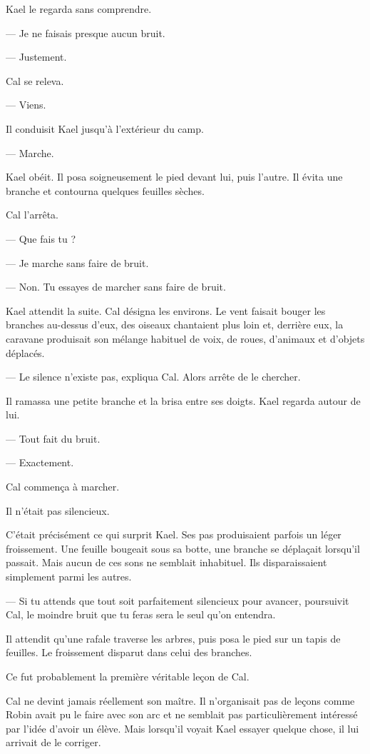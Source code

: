 Kael le regarda sans comprendre.

— Je ne faisais presque aucun bruit.

— Justement.

Cal se releva.

— Viens.

\scenebreak

Il conduisit Kael jusqu'à l'extérieur du camp.

— Marche.

Kael obéit. Il posa soigneusement le pied devant lui, puis l'autre. Il évita
une branche et contourna quelques feuilles sèches.

Cal l'arrêta.

— Que fais tu ?

— Je marche sans faire de bruit.

— Non. Tu essayes de marcher sans faire de bruit.

Kael attendit la suite. Cal désigna les environs. Le vent faisait bouger les
branches au-dessus d'eux, des oiseaux chantaient plus loin et, derrière eux, la
caravane produisait son mélange habituel de voix, de roues, d'animaux et
d'objets déplacés.

— Le silence n'existe pas, expliqua Cal. Alors arrête de le chercher.

Il ramassa une petite branche et la brisa entre ses doigts. Kael regarda autour
de lui.

— Tout fait du bruit.

— Exactement.

Cal commença à marcher.

Il n'était pas silencieux.

C'était précisément ce qui surprit Kael. Ses pas produisaient parfois un léger
froissement. Une feuille bougeait sous sa botte, une branche se déplaçait
lorsqu'il passait. Mais aucun de ces sons ne semblait inhabituel. Ils
disparaissaient simplement parmi les autres.

— Si tu attends que tout soit parfaitement silencieux pour avancer, poursuivit
Cal, le moindre bruit que tu feras sera le seul qu'on entendra.

Il attendit qu'une rafale traverse les arbres, puis posa le pied sur un tapis
de feuilles. Le froissement disparut dans celui des branches.

Ce fut probablement la première véritable leçon de Cal.

\scenebreak

Cal ne devint jamais réellement son maître. Il n'organisait pas de leçons comme
Robin avait pu le faire avec son arc et ne semblait pas particulièrement
intéressé par l'idée d'avoir un élève. Mais lorsqu'il voyait Kael essayer
quelque chose, il lui arrivait de le corriger.

